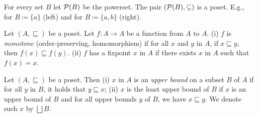    
   


\begin{example}
 For every set $B$ let $\mathcal{P}(B)$ be the powerset. 
 The pair $(\mathcal{P}(B),\subseteq)$ is a poset. E.g., for $B\coloneqq \{a\}$ (left) and for $B \coloneqq \{a,b\}$ (right).
 \begin{center}
 
 \end{center}

\end{example}


\begin{definition}[Fixpoint]
Let $(A,\sqsubseteq)$ be a poset. Let $f\colon A\to A$ be a function from $A$ to $A$.
(i) $f$ is \emph{monotone} (order-preserving, homomorphism) if for all $x$ and $y$ in $A$, if $x \sqsubseteq y$, then $f(x) \sqsubseteq f(y)$. (ii) $f$ has a fixpoint $x$ in $A$ if there exists $x$ in $A$ such that $f(x)=x$. 
\end{definition}


\begin{definition}
    Let $(A,\sqsubseteq)$ be a poset. Then (i) $x$ in $A$ is an \emph{upper bound} on a subset $B$ of $A$ if for all $y$ in $B$, it holds that $y \sqsubseteq x$; 
    (ii) $x$ is the least upper bound of $B$ if $x$ is an upper bound of $B$ and for all upper bounds $y$ of $B$, we have $x \sqsubseteq y$. We denote such $x$ by $\bigsqcup B$.
\end{definition}

